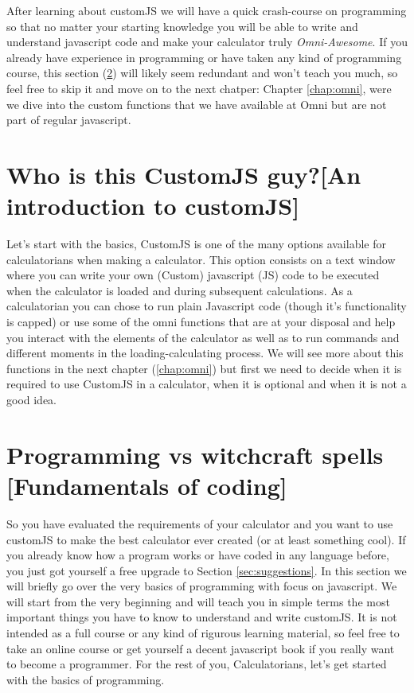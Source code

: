 \documentclass[11pt,a4paper,oldfontcommands]{memoir}
\begin{document}
After learning about customJS we will have a quick crash-course on programming so that no matter your starting knowledge you will be able to write and understand javascript code and make your calculator truly \textit{Omni-Awesome}\textsuperscript{\textregistered}. If you already have experience in programming or have taken any kind of programming course, this section (\ref{sec:fundamentals}) will likely seem redundant and won't teach you much, so feel free to skip it and move on to the next chatper: Chapter \ref{chap:omni}, were we dive into the custom functions that we have available at Omni but are not part of regular javascript.
    
    \section{Who is this CustomJS guy?\small[An introduction to customJS]}
        \label{sec:whatIs}
    Let's start with the basics, CustomJS is one of the many options available for calculatorians when making a calculator. This option consists on a text window where you can write your own (Custom) javascript (JS) code to be executed when the calculator is loaded and during subsequent calculations. 
    As a calculatorian you can chose to run plain Javascript code (though it's functionality is capped) or use some of the omni functions that are at your disposal and help you interact with the elements of the calculator as well as to run commands and different moments in the loading-calculating process. We will see more about this functions in the next chapter (\ref{chap:omni}) but first we need to decide when it is required to use CustomJS in a calculator, when it is optional and when it is not a good idea.
    
    
    \section{Programming vs witchcraft spells \small[Fundamentals of coding]}    
        \label{sec:fundamentals}
    So you have evaluated the requirements of your calculator and you want to use customJS to make the best calculator ever created (or at least something cool). If you already know how a program works or have coded in any language before, you just got yourself a free upgrade to Section \ref{sec:suggestions}. 
    In this section we will briefly go over the very basics of programming with focus on javascript. We will start from the very beginning and will teach you in simple terms the most important things you have to know to understand and write customJS. It is not intended as a full course or any kind of rigurous learning material, so feel free to take an online course or get yourself a decent javascript book if you really want to become a programmer.
    For the rest of you, Calculatorians, let's get started with the basics of programming.
        
    
\end{document}
